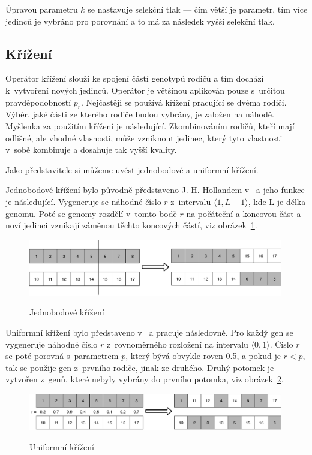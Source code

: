Úpravou parametru $k$ se nastavuje selekční tlak --- čím větší je parametr, tím více jedinců je vybráno pro porovnání a to má za následek vyšší selekční tlak.

\subsection{Křížení}
Operátor křížení slouží ke spojení částí genotypů rodičů a tím dochází k~vytvoření nových jedinců.
Operátor je většinou aplikován pouze s~určitou pravděpodobností $p_r$.
Nejčastěji se používá křížení pracující se dvěma rodiči.
Výběr, jaké části ze kterého rodiče budou vybrány, je založen na náhodě.
Myšlenka za použitím křížení je následující.
Zkombinováním rodičů, kteří mají odlišné, ale vhodné vlasnosti, může vzniknout jedinec, který tyto vlastnosti v~sobě kombinuje a dosahuje tak vyšší kvality.

Jako představitele si můžeme uvést jednobodové a uniformní křížení.

Jednobodové křížení bylo původně představeno J. H. Hollandem v~\cite{Holland1992} a jeho funkce je následující.
Vygeneruje se náhodné číslo $r$ z~intervalu $\langle 1, L-1\rangle$, kde L je délka genomu.
Poté se genomy rozdělí v~tomto bodě $r$ na počáteční a koncovou část a noví jedinci vznikají záměnou těchto koncových částí, viz obrázek~\ref{fig:jednobodove_krizeni}.

\begin{figure}[h]
    \centering
    {\includegraphics[width=30em]{obrazky/jedobodove_krizeni.pdf}}
    \caption{
    Jednobodové křížení
    }
    \label{fig:jednobodove_krizeni}
\end{figure}

Uniformní křížení bylo představeno v~\cite{Syswerda1989} a pracuje následovně.
Pro každý gen se vygeneruje náhodné číslo $r$ z~rovnoměrného rozložení na intervalu $\langle 0, 1\rangle$.
Číslo $r$ se poté porovná s~parametrem $p$, který bývá obvykle roven 0.5, a pokud je $r < p$, tak se použije gen z~prvního rodiče, jinak ze druhého.
Druhý potomek je vytvořen z~genů, které nebyly vybrány do prvního potomka, viz obrázek~\ref{fig:uniformni_krizeni}.

\begin{figure}[h]
    \centering
    {\includegraphics[width=30em]{obrazky/uniformni_krizeni.pdf}}
    \caption{
    Uniformní křížení
    }
    \label{fig:uniformni_krizeni}
\end{figure}


